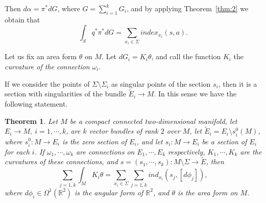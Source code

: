 \documentclass[12pt,letterpaper]{amsart}
\theoremstyle{definition}
\theoremstyle{plain}
\newtheorem{thm}{Theorem}
\theoremstyle{remark}
\begin{document}
Then $d\alpha = \pi^* dG$, where $G = \sum_{i=1}^k G_i$, and by applying Theorem~\ref{thm:2} we obtain that
\begin{equation}
\int_S q^{*}\pi^{*}dG=\sum_{x_i \in \Sigma} index_{x_i}(s,a).
\label{eq:88}
\end{equation}

Let us fix an area form $\theta$ on $M$.
Let $dG_i = K_i \theta$, and call the function $K_i$ the \emph{curvature of the connection} $\omega_i$.

If we consider the points of $\Sigma \setminus \Sigma_i$ as singular points of the section $s_i$, then it is a section with singularities of the bundle $\tilde{E}_i \rightarrow M$.
In this sense we have the following statement.
\begin{thm}
Let $M$ be a compact connected two-dimensional manifold, let $E_i\rightarrow M, \ i=1, \cdots, k$, are $k$ vector bundles of rank $2$ over $M$, let $\tilde{E}_i =E_i\setminus s^0_i(M)$, where $s^0_i: M\rightarrow E_i$ is the zero section of $E_i$, and let $s_i : M \rightarrow E_i$ be a section of $E_i$ for each $i$.
If $\omega_1, \cdots, \omega_k$ are connections on $E_1, \cdots, E_k$ respectively, $K_1, \cdots, K_k$ are the curvatures of these connections, and $s = (s_1, \cdots, s_k) : M\setminus \Sigma \rightarrow \tilde{E}$, then
\begin{equation}
\sum_{j=\overline{1, k}}\int_M K_i \theta = \sum_{x_i \in \Sigma} \sum_{j=\overline{1, k}}ind_{x_i}(s_j, [d\phi_j]),
\label{eq:89}
\end{equation}
where $d\phi_i\in \Omega^{1}(\mathbb{R}^{2})$ is the angular form of $\mathbb{R}^{2}$, and $\theta$ is the area form on $M$.
\label{thm:5}
\end{thm}
\end{document}
